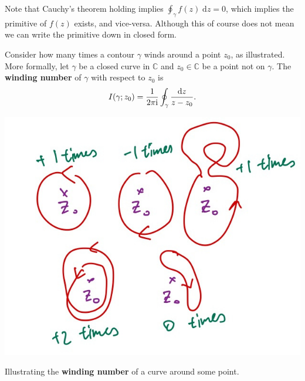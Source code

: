 \documentclass[letter-paper]{tufte-book}
\newcommand{\zi}{{\rm i}}
\newcommand\Def[1]{\textbf{#1}}
\begin{document}
Note that Cauchy's theorem holding implies $\oint_\gamma f(z)\; \mathrm{d}z =
0$, which implies the primitive of $f(z)$ exists, and vice-versa. Although this
of course does not mean we can write the primitive down in closed form.

Consider how many times a contour $\gamma$ winds around a point $z_0$, as
illustrated. More formally, let $\gamma$ be a closed curve in $\mathbb{C}$ and
$z_0 \in \mathbb{C}$ be a point not on $\gamma$. The \Def{winding number} of
$\gamma$ with respect to $z_0$ is
\begin{equation}
  I(\gamma; z_0) = \frac{1}{2\pi\zi} \oint_\gamma \frac{\mathrm{d}z}{z - z_0}.
\end{equation}
\begin{marginfigure}
  \includegraphics{figs/comp_winding_number}
  \caption{Illustrating the \textbf{winding number} of a curve around some
  point.}
\end{marginfigure}
\end{document}
